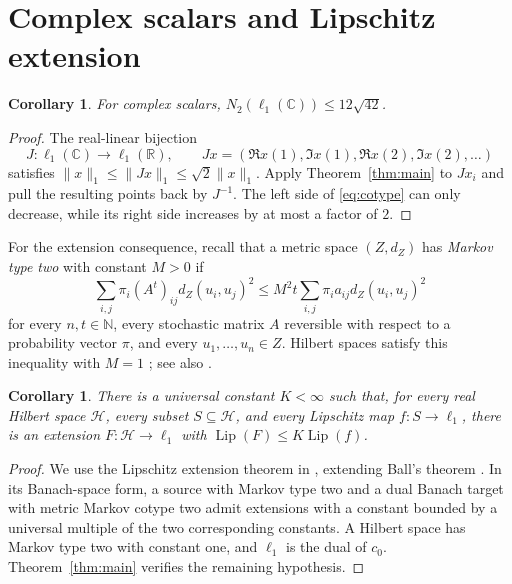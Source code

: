 \documentclass[11pt]{article}
\newtheorem{corollary}[theorem]{Corollary}
\theoremstyle{definition}
\theoremstyle{remark}
\numberwithin{equation}{section}
\newcommand{\R}{\mathbb R}
\newcommand{\N}{\mathbb N}
\DeclareMathOperator{\Lip}{Lip}
\begin{document}
\section{Complex scalars and Lipschitz extension}
\label{sec:consequences}

\begin{corollary}\label{cor:complex}
For complex scalars,
$N_2(\ell_1(\mathbb C))\leq12\sqrt{42}$.
\end{corollary}
\begin{proof}
The real-linear bijection
\[
 J:\ell_1(\mathbb C)\longrightarrow\ell_1(\R),\qquad
 Jx=(\Re x(1),\Im x(1),\Re x(2),\Im x(2),\ldots)
\]
satisfies
$\|x\|_1\leq\|Jx\|_1\leq\sqrt2\|x\|_1$.
Apply Theorem~\ref{thm:main} to $Jx_i$ and pull the resulting
points back by $J^{-1}$. The left side of \eqref{eq:cotype}
can only decrease, while its right side increases by at most
a factor of $2$.
\end{proof}

For the extension consequence, recall that a metric space
$(Z,d_Z)$ has \emph{Markov type two} with constant $M>0$ if
\[
 \sum_{i,j}\pi_i(A^t)_{ij}d_Z(u_i,u_j)^2
 \leq M^2t\sum_{i,j}\pi_i a_{ij}d_Z(u_i,u_j)^2
\]
for every $n,t\in\N$, every stochastic matrix $A$ reversible
with respect to a probability vector $\pi$, and every
$u_1,\ldots,u_n\in Z$. Hilbert spaces satisfy this inequality
with $M=1$ \cite{Ball92}; see also \cite[Definition~1.1 and the following
discussion]{MendelNaor13}.

\begin{samepage}
\begin{corollary}\label{cor:extension}
There is a universal constant $K<\infty$ such that, for every
real Hilbert space $\mathcal H$, every subset $S\subseteq\mathcal H$,
and every Lipschitz map $f:S\to\ell_1$, there is an extension
$F:\mathcal H\to\ell_1$ with
$\Lip(F)\leq K\Lip(f)$.
\end{corollary}
\begin{proof}
We use the Lipschitz extension theorem in
\cite[Corollary~1.13]{MendelNaor13}, extending Ball's theorem
\cite{Ball92}. In its Banach-space form, a source with Markov
type two and a dual Banach target with metric Markov cotype two
admit extensions with a constant bounded by a universal multiple
of the two corresponding constants. A Hilbert space has Markov
type two with constant one, and $\ell_1$ is the dual of $c_0$.
Theorem~\ref{thm:main} verifies the remaining hypothesis.
\end{proof}
\end{samepage}



\end{document}
